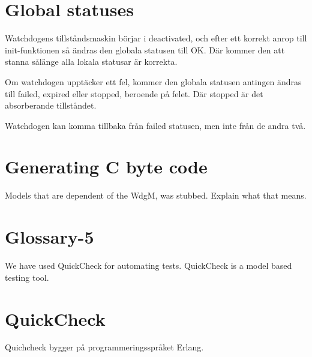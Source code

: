 \documentclass[a4paper]{article}
\begin{document}
\section{Global statuses}
Watchdogens tillståndsmaskin börjar i deactivated, och efter ett
korrekt anrop till init-funktionen så ändras den globala statusen till
OK.
Där kommer den att stanna sålänge alla lokala statusar är korrekta.

Om watchdogen upptäcker ett fel, kommer den globala statusen
antingen ändras till failed, expired eller stopped, beroende på
felet. Där stopped är det absorberande tillståndet.

Watchdogen kan komma tillbaka från failed statusen, men inte från de
andra två.







\section{Generating C byte code}
Models that are dependent of the WdgM, was stubbed. Explain what that means.

\section{Glossary-5}
We have used QuickCheck for automating tests. QuickCheck is a model
based testing tool.

\section{QuickCheck}
Quichcheck bygger på programmeringsspråket Erlang.
\end{document}
